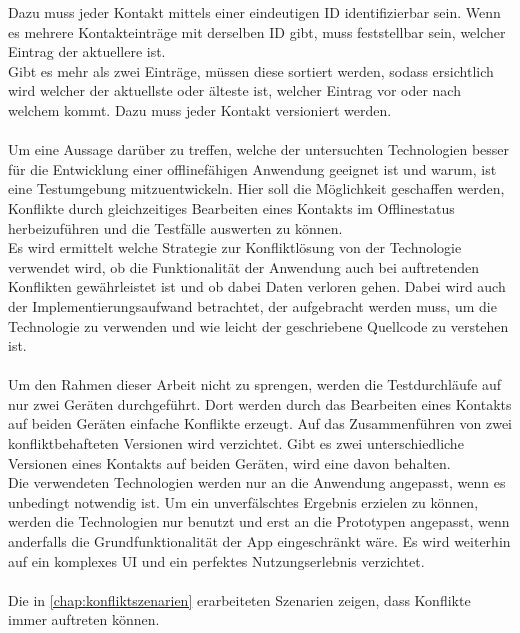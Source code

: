 Dazu muss jeder Kontakt mittels einer eindeutigen ID identifizierbar sein.
Wenn es mehrere Kontakteinträge mit derselben ID gibt, muss feststellbar sein, welcher Eintrag der aktuellere ist.\\
Gibt es mehr als zwei Einträge, müssen diese sortiert werden, sodass ersichtlich wird welcher der aktuellste oder älteste ist, welcher Eintrag vor oder nach welchem kommt. Dazu muss jeder Kontakt versioniert werden.\\\\
Um eine Aussage darüber zu treffen, welche der untersuchten Technologien besser für die Entwicklung einer offlinefähigen Anwendung geeignet ist und warum, ist eine Testumgebung mitzuentwickeln. Hier soll die Möglichkeit geschaffen werden, Konflikte durch gleichzeitiges Bearbeiten eines Kontakts im Offlinestatus herbeizuführen und die Testfälle auswerten zu können.\\
Es wird ermittelt welche Strategie zur Konfliktlösung von der Technologie verwendet wird, ob die Funktionalität der Anwendung auch bei auftretenden Konflikten gewährleistet ist und ob dabei Daten verloren gehen.
Dabei wird auch der Implementierungsaufwand betrachtet, der aufgebracht werden muss, um die Technologie zu verwenden und wie leicht der geschriebene Quellcode zu verstehen ist.\\\\
%
%
Um den Rahmen dieser Arbeit nicht zu sprengen, werden die Testdurchläufe auf nur zwei Geräten durchgeführt.
Dort werden durch das Bearbeiten eines Kontakts auf beiden Geräten einfache Konflikte erzeugt.
Auf das Zusammenführen von zwei konfliktbehafteten Versionen wird verzichtet.
Gibt es zwei unterschiedliche Versionen eines Kontakts auf beiden Geräten, wird eine davon behalten.\\
Die verwendeten Technologien werden nur an die Anwendung angepasst, wenn es unbedingt notwendig ist.
Um ein unverfälschtes Ergebnis erzielen zu können, werden die Technologien nur benutzt und erst an die Prototypen angepasst, wenn anderfalls die Grundfunktionalität der \gls{App} eingeschränkt wäre.
Es wird weiterhin auf ein komplexes \gls{UI} und ein perfektes Nutzungserlebnis verzichtet.\\\\
%
%
Die in \autoref{chap:konfliktszenarien} erarbeiteten Szenarien zeigen, dass Konflikte immer auftreten können.
